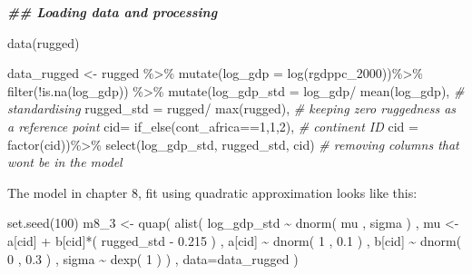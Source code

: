 \documentclass[
]{book}
\newenvironment{Shaded}{\begin{snugshade}}{\end{snugshade}}
\newcommand{\AttributeTok}[1]{\textcolor[rgb]{0.77,0.63,0.00}{#1}}
\newcommand{\CommentTok}[1]{\textcolor[rgb]{0.56,0.35,0.01}{\textit{#1}}}
\newcommand{\DecValTok}[1]{\textcolor[rgb]{0.00,0.00,0.81}{#1}}
\newcommand{\DocumentationTok}[1]{\textcolor[rgb]{0.56,0.35,0.01}{\textbf{\textit{#1}}}}
\newcommand{\FloatTok}[1]{\textcolor[rgb]{0.00,0.00,0.81}{#1}}
\newcommand{\FunctionTok}[1]{\textcolor[rgb]{0.00,0.00,0.00}{#1}}
\newcommand{\NormalTok}[1]{#1}
\newcommand{\OtherTok}[1]{\textcolor[rgb]{0.56,0.35,0.01}{#1}}
\newcommand{\SpecialCharTok}[1]{\textcolor[rgb]{0.00,0.00,0.00}{#1}}
\begin{document}
\begin{Shaded}
\begin{Highlighting}[]
\DocumentationTok{\#\# Loading data and processing}

\FunctionTok{data}\NormalTok{(rugged) }

\NormalTok{data\_rugged }\OtherTok{\textless{}{-}}\NormalTok{ rugged }\SpecialCharTok{\%\textgreater{}\%}
  \FunctionTok{mutate}\NormalTok{(}\AttributeTok{log\_gdp =} \FunctionTok{log}\NormalTok{(rgdppc\_2000))}\SpecialCharTok{\%\textgreater{}\%}
  \FunctionTok{filter}\NormalTok{(}\SpecialCharTok{!}\FunctionTok{is.na}\NormalTok{(log\_gdp)) }\SpecialCharTok{\%\textgreater{}\%}
  \FunctionTok{mutate}\NormalTok{(}\AttributeTok{log\_gdp\_std =}\NormalTok{ log\_gdp}\SpecialCharTok{/} \FunctionTok{mean}\NormalTok{(log\_gdp), }\CommentTok{\# standardising}
         \AttributeTok{rugged\_std =}\NormalTok{ rugged}\SpecialCharTok{/} \FunctionTok{max}\NormalTok{(rugged), }\CommentTok{\# keeping zero ruggedness as a reference point}
         \AttributeTok{cid=} \FunctionTok{if\_else}\NormalTok{(cont\_africa}\SpecialCharTok{==}\DecValTok{1}\NormalTok{,}\DecValTok{1}\NormalTok{,}\DecValTok{2}\NormalTok{), }\CommentTok{\# continent ID}
         \AttributeTok{cid =} \FunctionTok{factor}\NormalTok{(cid))}\SpecialCharTok{\%\textgreater{}\%}
    \FunctionTok{select}\NormalTok{(log\_gdp\_std, rugged\_std, cid) }\CommentTok{\# removing columns that won\textquotesingle{}t be in the model }
\end{Highlighting}
\end{Shaded}

The model in chapter 8, fit using quadratic approximation looks like this:

\begin{Shaded}
\begin{Highlighting}[]
\FunctionTok{set.seed}\NormalTok{(}\DecValTok{100}\NormalTok{)}
\NormalTok{m8\_3 }\OtherTok{\textless{}{-}} \FunctionTok{quap}\NormalTok{( }\FunctionTok{alist}\NormalTok{(}
\NormalTok{log\_gdp\_std }\SpecialCharTok{\textasciitilde{}} \FunctionTok{dnorm}\NormalTok{( mu , sigma ) , }
\NormalTok{mu }\OtherTok{\textless{}{-}}\NormalTok{ a[cid] }\SpecialCharTok{+}\NormalTok{ b[cid]}\SpecialCharTok{*}\NormalTok{( rugged\_std }\SpecialCharTok{{-}} \FloatTok{0.215}\NormalTok{ ) , }
\NormalTok{a[cid] }\SpecialCharTok{\textasciitilde{}} \FunctionTok{dnorm}\NormalTok{( }\DecValTok{1}\NormalTok{ , }\FloatTok{0.1}\NormalTok{ ) , }
\NormalTok{b[cid] }\SpecialCharTok{\textasciitilde{}} \FunctionTok{dnorm}\NormalTok{( }\DecValTok{0}\NormalTok{ , }\FloatTok{0.3}\NormalTok{ ) , }
\NormalTok{sigma }\SpecialCharTok{\textasciitilde{}} \FunctionTok{dexp}\NormalTok{( }\DecValTok{1}\NormalTok{ )}
\NormalTok{) , }\AttributeTok{data=}\NormalTok{data\_rugged )  }
\end{Highlighting}
\end{Shaded}
\end{document}
